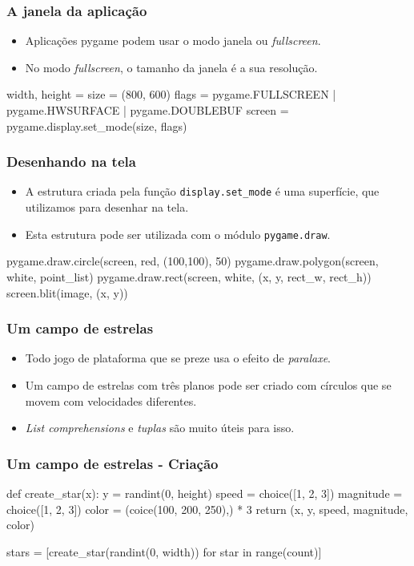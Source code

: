 \begin{frame}[fragile]
    \frametitle{A janela da aplicação}

    \begin{itemize}
        \item Aplicações pygame podem usar o modo janela ou \textit{fullscreen}.
        \item No modo \textit{fullscreen}, o tamanho da janela é a sua resolução.
    \end{itemize}
    \begin{python}
    width, height = size = (800, 600)
    flags = pygame.FULLSCREEN | pygame.HWSURFACE | pygame.DOUBLEBUF
    screen = pygame.display.set_mode(size, flags)
    \end{python}
\end{frame}

\begin{frame}[fragile]
    \frametitle{Desenhando na tela}
    \begin{itemize}
        \item A estrutura criada pela função \texttt{display.set\_mode} é uma
        superfície, que utilizamos para desenhar na tela.
        \item Esta estrutura pode ser utilizada com o módulo \texttt{pygame.draw}.
    \end{itemize}
    \vfill
    \begin{python}
        pygame.draw.circle(screen, red, (100,100), 50)
        pygame.draw.polygon(screen, white, point_list)
        pygame.draw.rect(screen, white, (x, y, rect_w, rect_h))
        screen.blit(image, (x, y))
    \end{python}
\end{frame}

\begin{frame}
    \frametitle{Um campo de estrelas}

    \begin{itemize}
        \item Todo jogo de plataforma que se preze usa o efeito de \textit{paralaxe}.
        \item Um campo de estrelas com três planos pode ser criado com círculos
        que se movem com velocidades diferentes.
        \item \textit{List comprehensions} e \textit{tuplas} são muito úteis para isso.
    \end{itemize}
\end{frame}

\begin{frame}[fragile]
    \frametitle{Um campo de estrelas - Criação}

    \begin{python}
    def create_star(x):
        y = randint(0, height)
        speed = choice([1, 2, 3])
        magnitude = choice([1, 2, 3])
        color = (coice(100, 200, 250),) * 3
        return (x, y, speed, magnitude, color)

    stars = [create_star(randint(0, width)) for star in range(count)]
    \end{python}
\end{frame}

